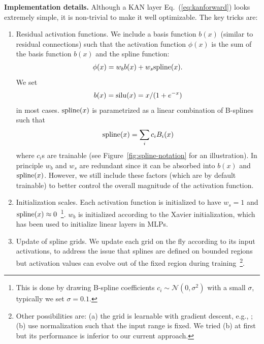 \documentclass{article}
\numberwithin{equation}{section}
\numberwithin{figure}{section}
\begin{document}
{\bf Implementation details.}
Although a KAN layer Eq.~(\ref{eq:kanforward}) looks extremely simple, it is non-trivial to make it well optimizable. The key tricks are: %
\begin{enumerate}[(1)]
    \item  Residual activation functions. We include a basis function $b(x)$ (similar to residual connections) such that the activation function $\phi(x)$ is the sum of the basis function $b(x)$ and the spline function:
    \begin{align}
        \phi(x)=w_{b} b(x)+w_{s}{\rm spline}(x).
    \end{align}
    We set
    \begin{align}
        b(x)={\rm silu}(x)=x/(1+e^{-x})
    \end{align}
    in most cases. ${\rm spline}(x)$ is parametrized as a linear combination of B-splines such that
    \begin{align}
        {\rm spline}(x) = \sum_i c_iB_i(x)
    \end{align}
    where $c_i$s are trainable (see Figure~\ref{fig:spline-notation} for an illustration). In principle $w_b$ and $w_s$ are redundant since it can be absorbed into $b(x)$ and ${\rm spline}(x)$. However, we still include these factors (which are by default trainable) to better control the overall magnitude of the activation function.
    \item Initialization scales. Each activation function is initialized to have $w_s=1$ and ${\rm spline}(x)\approx 0$~\footnote{This is done by drawing B-spline coefficients $c_i\sim\mathcal{N}(0,\sigma^2)$ with a small $\sigma$, typically we set $\sigma=0.1$.}. $w_b$ is initialized according to the Xavier initialization, which has been used to initialize linear layers in MLPs.
    \item Update of spline grids. We update each grid on the fly according to its input activations, to address the issue that splines are defined on bounded regions but activation values can evolve out of the fixed region during training~\footnote{Other possibilities are: (a) the grid is learnable with gradient descent, e.g., \cite{xu2015nonlinear}; (b) use normalization such that the input range is fixed. We tried (b) at first but its performance is inferior to our current approach.}. 
\end{enumerate}
\end{document}
